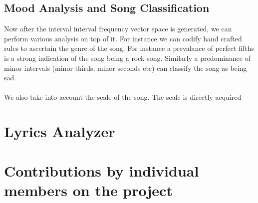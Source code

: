 \documentclass[letterpaper, 11pt]{article}
\begin{document}
\subsection*{Mood Analysis and Song Classification}
Now after the interval interval frequency vector space is generated, we can perform various analysis on top of it. For instance we can codify hand crafted rules to ascertain the genre of the song. For instance a prevalance of perfect fifths is a strong indication of the song being a rock song. Similarly a predominance of minor intervals (minor thirds, minor seconds etc) can classify the song as being sad. \\\\
We also take into account the scale of the song. The scale is directly acquired 

\section*{Lyrics Analyzer}

\section*{Contributions by individual members on the project}
\end{document}

